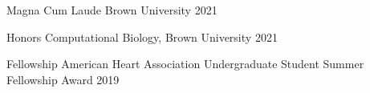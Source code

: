 



\begin{cvhonors}

  \cvhonor
    {Magna Cum Laude} %
    {Brown University} %
    {2021} %

  \cvhonor
    {Honors} %
    {Computational Biology, Brown University} %
    {2021} %

  \cvhonor
    {Fellowship} %
    {American Heart Association Undergraduate Student Summer Fellowship Award} %
    {2019} %

\end{cvhonors}




